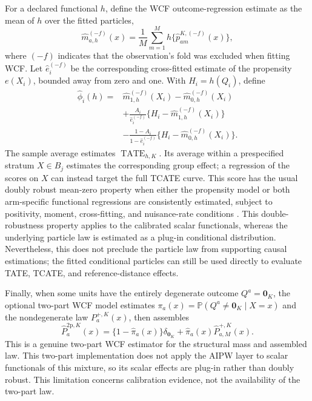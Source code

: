 \documentclass[twoside]{article}
\newcommand{\Prob}{\mathbb{P}}
\newcommand{\TATE}{\operatorname{TATE}}
\begin{document}
For a declared functional $h$, define the WCF outcome-regression estimate as the mean of $h$ over the fitted particles,
\[
 \widehat m_{a,h}^{(-f)}(x)
 =\frac{1}{M}\sum_{m=1}^M h\{\widehat p_{am}^{K,(-f)}(x)\},
\]
where $(-f)$ indicates that the observation's fold was excluded when fitting WCF. Let $\widehat e_i^{(-f)}$ be the corresponding cross-fitted estimate of the propensity $e(X_i)$, bounded away from zero and one. With $H_i=h(Q_i)$, define
\begin{align}
 \widehat\phi_i(h)={}&\widehat m_{1,h}^{(-f)}(X_i)-\widehat m_{0,h}^{(-f)}(X_i)\nonumber\\
 &+\frac{A_i}{\widehat e_i^{(-f)}}\{H_i-\widehat m_{1,h}^{(-f)}(X_i)\}\nonumber\\
 &-\frac{1-A_i}{1-\widehat e_i^{(-f)}}\{H_i-\widehat m_{0,h}^{(-f)}(X_i)\}.\label{eq:aipw}
\end{align}
The sample average estimates $\TATE_{h,K}$. Its average within a prespecified stratum $X\in B_j$ estimates the corresponding group effect; a regression of the scores on $X$ can instead target the full TCATE curve. This score has the usual doubly robust mean-zero property when either the propensity model or both arm-specific functional regressions are consistently estimated, subject to positivity, moment, cross-fitting, and nuisance-rate conditions \citep{bang2005doubly,chernozhukov2018double}. This double-robustness property applies to the calibrated scalar functionals, whereas the underlying particle law is estimated as a plug-in conditional distribution. Nevertheless, this does not preclude the particle law from supporting causal estimations; the fitted conditional particles can still be used directly to evaluate TATE, TCATE, and reference-distance effects.

Finally, when some units have the entirely degenerate outcome $Q^a=\mathbf 0_K$, the optional two-part WCF model estimates $\pi_a(x)=\Prob(Q^a\neq\mathbf0_K\mid X=x)$ and the nondegenerate law $P_a^{+,K}(x)$, then assembles
\begin{equation}
 \widehat P_a^{\mathrm{2p},K}(x)=
 \{1-\widehat\pi_a(x)\}\delta_{\mathbf0_K}
 +\widehat\pi_a(x)\widehat P_{a,M}^{+,K}(x).\label{eq:two-part}
\end{equation}
This is a genuine two-part WCF estimator for the structural mass and assembled law. This two-part implementation does not apply the AIPW layer to scalar functionals of this mixture, so its scalar effects are plug-in rather than doubly robust. This limitation concerns calibration evidence, not the availability of the two-part law.
\end{document}
